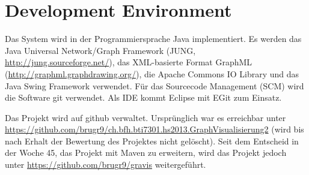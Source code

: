 \section{Development Environment}
\label{sec:Development Environment}
Das System wird in der Programmiersprache Java implementiert. Es werden das Java Universal Network/Graph Framework (JUNG, \url{http://jung.sourceforge.net/}), das XML-basierte Format GraphML (\url{http://graphml.graphdrawing.org/}), die Apache Commons IO Library und das Java Swing Framework verwendet. F\"ur das Sourcecode Management (SCM) wird die Software git verwendet. Als IDE kommt Eclipse mit EGit zum Einsatz.

Das Projekt wird auf github verwaltet. Urspr\"unglich war es erreichbar unter \url{https://github.com/brugr9/ch.bfh.bti7301.hs2013.GraphVisualisierung2} (wird bis nach Erhalt der Bewertung des Projektes nicht gel\"oscht). Seit dem Entscheid in der Woche 45, das Projekt mit Maven zu erweitern, wird das Projekt jedoch unter \url{https://github.com/brugr9/gravis} weitergef\"uhrt.